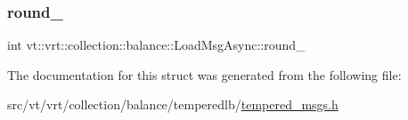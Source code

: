 \subsubsection{\texorpdfstring{round\+\_\+}{round\_}}
{\footnotesize\ttfamily int vt\+::vrt\+::collection\+::balance\+::\+Load\+Msg\+Async\+::round\+\_\+\hspace{0.3cm}{\ttfamily [private]}}



The documentation for this struct was generated from the following file\+:\begin{DoxyCompactItemize}
\item 
src/vt/vrt/collection/balance/temperedlb/\hyperlink{tempered__msgs_8h}{tempered\+\_\+msgs.\+h}\end{DoxyCompactItemize}
